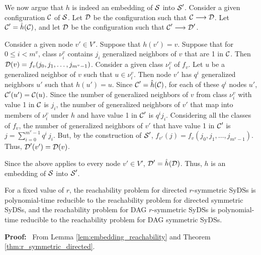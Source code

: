 We now argue that $h$ is indeed an embedding of $\mbox{$\mathcal{S}$}$ into $\mbox{$\mathcal{S}$}'$.
Consider a given configuration $\mbox{$\mathcal{C}$}$ of $\mbox{$\mathcal{S}$}$.
Let $\mbox{$\mathcal{D}$}$  be the configuration such that $\mbox{$\mathcal{C}$} \longrightarrow \mbox{$\mathcal{D}$}$.
Let $\mbox{$\mathcal{C}$}' =\hat{h}(\mbox{$\mathcal{C}$})$, 
and let $\mbox{$\mathcal{D}$}$  be the configuration such that $\mbox{$\mathcal{C}$}' \longrightarrow \mbox{$\mathcal{D}$}'$.

Consider a given node $v' \in V'$.
Suppose that $h(v') = v$.
Suppose that for $0 \leq i < m^v$,
class $\nu_i^v$ contains $j_i$ generalized neighbors of $v$ that are 1 in $\mbox{$\mathcal{C}$}$.
Then $\mbox{$\mathcal{D}$}(v) = f_v(j_0,  j_1, \ldots , j_{m^v -1})$.
Consider a given class $\nu_i^v$ of $f_v$.
Let $u$ be a generalized neighbor of $v$ such that $ u \in \nu_i^v$.
Then node $v'$ has $q^i$ generalized neighbors $u'$ such that $h(u') = u$.
Since $\mbox{$\mathcal{C}$}' =\hat{h}(\mbox{$\mathcal{C}$})$, for each of these $q^i$ nodes $u'$,
$\mbox{$\mathcal{C}$}'(u') = \mbox{$\mathcal{C}$}(u)$.
Since the number of generalized neighbors of $v$ from class $\nu_i^v$ 
with value 1 in $\mbox{$\mathcal{C}$}$ is $j_i$,
the number of generalized neighbors of $v'$ 
that map into members of $\nu_i^v$ under $h$ and have value 1 in $\mbox{$\mathcal{C}$}'$ is $q^i j_i$.
Considering all the classes of $f_v$,
the number of generalized neighbors of $v'$ that have value 1 in $\mbox{$\mathcal{C}$}'$ is 
$j = \sum_{i=0}^{m^v-1} q^i \, j_i$.
But, by the construction of $\mbox{$\mathcal{S}$}'$,
$f_{v'}(j) = f_v(j_0,  j_1, \ldots , j_{m^v -1})$.
Thus, $\mbox{$\mathcal{D}$}'(v') = \mbox{$\mathcal{D}$}(v)$.

Since the above applies to every node $v' \in V'$,  $\mbox{$\mathcal{D}$}' =\hat{h}(\mbox{$\mathcal{D}$})$.
Thus, $h$ is an embedding of $\mbox{$\mathcal{S}$}$ into $\mbox{$\mathcal{S}$}'$.
\QED

\begin{corollary}\label{cor:reachability_symmetric}
For a fixed value of $r$, the reachability problem for directed $r$-symmetric  SyDSs 
is polynomial-time reducible to the reachability problem for directed symmetric SyDSs,
and  the reachability problem for DAG $r$-symmetric  SyDSs 
is polynomial-time reducible to the reachability problem for DAG  symmetric  SyDSs.
\end{corollary}
\noindent
\textbf{Proof:}~ 
From Lemma \ref{lem:embedding_reachability} and Theorem  \ref{thm:r_symmetric_directed}.
\QED

